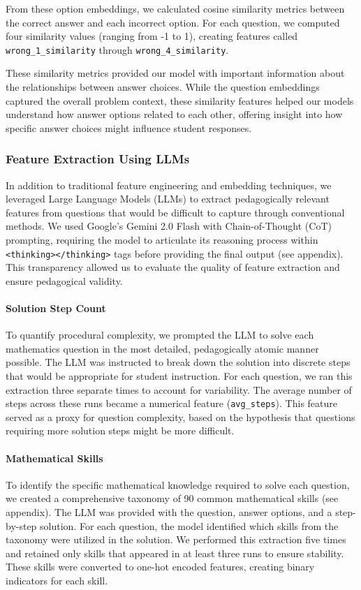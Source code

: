 \documentclass[
    a4paper, %
    10pt, %
    twoside, %
]{LTJournalArticle}
\begin{document}
From these option embeddings, we calculated cosine similarity metrics between the correct answer and each incorrect option. For each question, we computed four similarity values (ranging from -1 to 1), creating features called \texttt{wrong\_1\_similarity} through \texttt{wrong\_4\_similarity}.

These similarity metrics provided our model with important information about the relationships between answer choices. While the question embeddings captured the overall problem context, these similarity features helped our models understand how answer options related to each other, offering insight into how specific answer choices might influence student responses.

\subsubsection{Feature Extraction Using LLMs}

In addition to traditional feature engineering and embedding techniques, we leveraged Large Language Models (LLMs) to extract pedagogically relevant features from questions that would be difficult to capture through conventional methods. We used Google's Gemini 2.0 Flash with Chain-of-Thought (CoT) prompting, requiring the model to articulate its reasoning process within \texttt{<thinking></thinking>} tags before providing the final output (see appendix). This transparency allowed us to evaluate the quality of feature extraction and ensure pedagogical validity.

\paragraph{Solution Step Count}
To quantify procedural complexity, we prompted the LLM to solve each mathematics question in the most detailed, pedagogically atomic manner possible. The LLM was instructed to break down the solution into discrete steps that would be appropriate for student instruction. For each question, we ran this extraction three separate times to account for variability. The average number of steps across these runs became a numerical feature (\texttt{avg\_steps}). This feature served as a proxy for question complexity, based on the hypothesis that questions requiring more solution steps might be more difficult.

\paragraph{Mathematical Skills}
To identify the specific mathematical knowledge required to solve each question, we created a comprehensive taxonomy of 90 common mathematical skills (see appendix). The LLM was provided with the question, answer options, and a step-by-step solution. For each question, the model identified which skills from the taxonomy were utilized in the solution. We performed this extraction five times and retained only skills that appeared in at least three runs to ensure stability. These skills were converted to one-hot encoded features, creating binary indicators for each skill.
\end{document}

